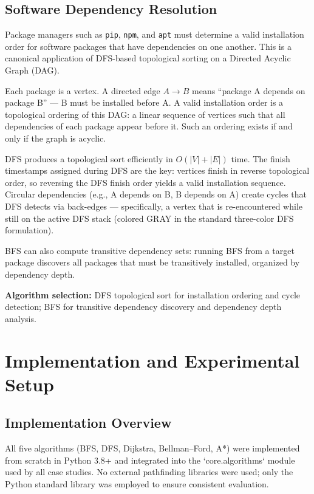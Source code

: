 \documentclass[12pt, a4paper, oneside]{report}
\theoremstyle{definition}
\begin{document}
\section{Software Dependency Resolution}

Package managers such as \texttt{pip}, \texttt{npm}, and \texttt{apt} must determine a valid installation order for software packages that have dependencies on one another. This is a canonical application of DFS-based topological sorting on a Directed Acyclic Graph (DAG).

Each package is a vertex. A directed edge $A \to B$ means ``package A depends on package B'' — B must be installed before A. A valid installation order is a topological ordering of this DAG: a linear sequence of vertices such that all dependencies of each package appear before it. Such an ordering exists if and only if the graph is acyclic.

DFS produces a topological sort efficiently in $O(|V| + |E|)$ time. The finish timestamps assigned during DFS are the key: vertices finish in reverse topological order, so reversing the DFS finish order yields a valid installation sequence. Circular dependencies (e.g., A depends on B, B depends on A) create cycles that DFS detects via back-edges — specifically, a vertex that is re-encountered while still on the active DFS stack (colored GRAY in the standard three-color DFS formulation).

BFS can also compute transitive dependency sets: running BFS from a target package discovers all packages that must be transitively installed, organized by dependency depth.

\textbf{Algorithm selection:} DFS topological sort for installation ordering and cycle detection; BFS for transitive dependency discovery and dependency depth analysis.

\chapter{Implementation and Experimental Setup}

\section{Implementation Overview}

All five algorithms (BFS, DFS, Dijkstra, Bellman–Ford, A*) were implemented from scratch in Python 3.8+ and integrated into the `core.algorithms` module used by all case studies. No external pathfinding libraries were used; only the Python standard library was employed to ensure consistent evaluation. 
\end{document}
